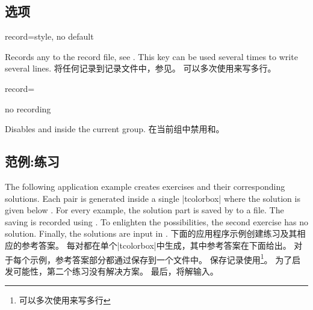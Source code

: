\subsection{选项}\label{sec:recording-options}
\begin{docTcbKey}[][doc new=2014-11-28]{record}{=}{style, no default}
\begin{stripedbox}
Records any  to the record file, see .
This key can be used several times to write several lines.
\tcblower
将任何记录到记录文件中，参见。%
可以多次使用来写多行。
\end{stripedbox}
  
  \begin{dispListing}
  record={\string{}}
  \end{dispListing}
\end{docTcbKey}

\begin{docTcbKey}[][doc new=2014-11-28]{no recording}{}{}
\begin{stripedbox}
Disables  and  inside the current   group.
\tcblower
在当前组中禁用和。
\end{stripedbox}
  
\end{docTcbKey}

\subsection{范例:练习}\label{sec:recording-exercises}
\begin{stripedbox}
The following application example creates exercises and their corresponding solutions. 
Each pair is generated inside a single |tcolorbox| where the solution is given below . 
For every example, the solution part is saved by  to a file. 
The saving is recorded using . 
To enlighten the possibilities, the second exercise has no solution. 
Finally, the solutions are input in .
\tcblower
下面的应用程序示例创建练习及其相应的参考答案。%
每对都在单个|tcolorbox|中生成，其中参考答案在下面给出。%
对于每个示例，参考答案部分都通过保存到一个文件中。%
保存记录使用\footnote{可以多次使用来写多行}。%
为了启发可能性，第二个练习没有解决方案。%
最后，将解输入。
\end{stripedbox}


